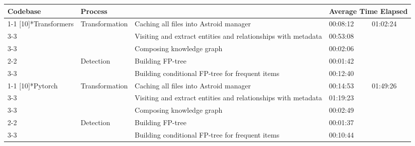 \begin{tabularx}{\textwidth}{p{2.4cm}p{2.4cm}Xp{1cm}p{1cm}}
\toprule
\textbf{Codebase} & \multicolumn{2}{l}{\textbf{Process}} & \multicolumn{2}{l}{\textbf{Average Time Elapsed}} \\
\cmidrule{1-1}\cmidrule{2-2}\cmidrule{3-3}\cmidrule{4-4}\cmidrule{5-5}
\multirow{5}[10]{*}{Transformers} & \multirow{3}[6]{*}{Transformation} & Caching all files into Astroid manager & 00:08:12 & \multirow{5}[10]{*}{01:02:24} \\
\cmidrule{3-3}\cmidrule{4-4}
 &  &  Visiting and extract entities and relationships with metadata & 00:53:08 &  \\
\cmidrule{3-3}\cmidrule{4-4}
 &  & Composing knowledge graph & 00:02:06 &  \\
\cmidrule{2-2}\cmidrule{3-3}\cmidrule{4-4}
 & \multirow{2}[4]{*}{Detection} & Building FP-tree & 00:01:42 &  \\
\cmidrule{3-3}\cmidrule{4-4}
 &  & Building conditional FP-tree for frequent items & 00:12:40 &  \\
\cmidrule{1-1}\cmidrule{2-2}\cmidrule{3-3}\cmidrule{4-4}\cmidrule{5-5}
\multirow{5}[10]{*}{Pytorch} & \multirow{3}[6]{*}{Transformation} & Caching all files into Astroid manager & 00:14:53 & \multirow{5}[10]{*}{01:49:26} \\
\cmidrule{3-3}\cmidrule{4-4}
 &  &  Visiting and extract entities and relationships with metadata & 01:19:23 &  \\
\cmidrule{3-3}\cmidrule{4-4}
 &  & Composing knowledge graph & 00:02:49 &  \\
\cmidrule{2-2}\cmidrule{3-3}\cmidrule{4-4}
 & \multirow{2}[4]{*}{Detection} & Building FP-tree & 00:01:37 &  \\
\cmidrule{3-3}\cmidrule{4-4}
 &  & Building conditional FP-tree for frequent items & 00:10:44 &  \\
\bottomrule
\end{tabularx}

